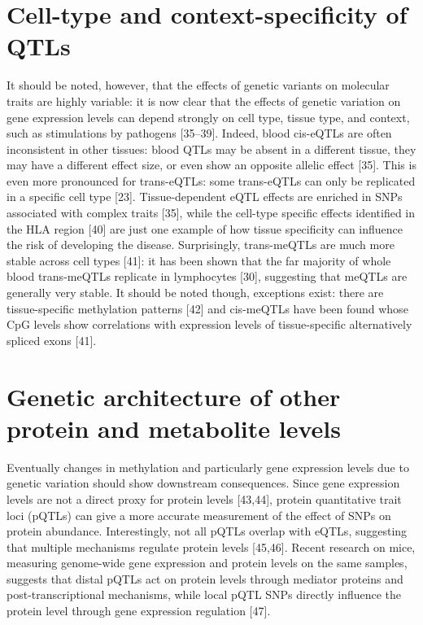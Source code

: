 \section{Cell-type and context-specificity of QTLs}
It should be noted, however, that the effects of genetic variants on molecular traits are highly variable: it is now clear that the effects of genetic variation on gene expression levels can depend strongly on cell type, tissue type, and context, such as stimulations by pathogens [35–39]. Indeed, blood cis-eQTLs are often inconsistent in other tissues: blood QTLs may be absent in a different tissue, they may have a different effect size, or even show an opposite allelic effect [35]. This is even more pronounced for trans-eQTLs: some trans-eQTLs can only be replicated in a specific cell type [23]. Tissue-dependent eQTL effects are enriched in SNPs associated with complex traits [35], while the cell-type specific effects identified in the HLA region [40] are just one example of how tissue specificity can influence the risk of developing the disease. Surprisingly, trans-meQTLs are much more stable across cell types [41]: it has been shown that the far majority of whole blood trans-meQTLs replicate in lymphocytes [30], suggesting that meQTLs are generally very stable. It should be noted though, exceptions exist: there are tissue-specific methylation patterns [42] and cis-meQTLs have been found whose CpG levels show correlations with expression levels of tissue-specific alternatively spliced exons [41].

\section{Genetic architecture of other protein and metabolite levels}
Eventually changes in methylation and particularly gene expression levels due to genetic variation should show downstream consequences. Since gene expression levels are not a direct proxy for protein levels [43,44], protein quantitative trait loci (pQTLs) can give a more accurate measurement of the effect of SNPs on protein abundance. Interestingly, not all pQTLs overlap with eQTLs, suggesting that multiple mechanisms regulate protein levels [45,46]. Recent research on mice, measuring genome-wide gene expression and protein levels on the same samples, suggests that distal pQTLs act on protein levels through mediator proteins and post-transcriptional mechanisms, while local pQTL SNPs directly influence the protein level through gene expression regulation [47]. 

